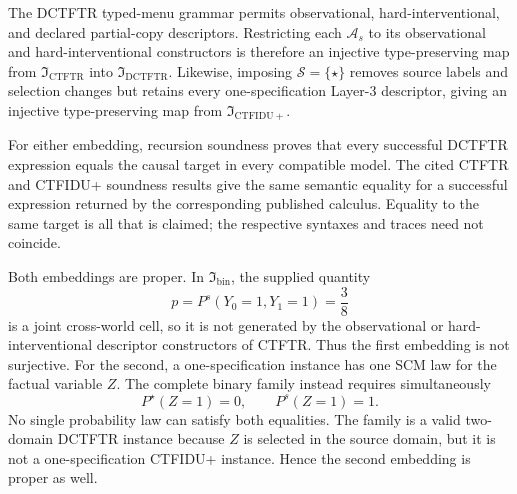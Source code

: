 The DCTFTR typed-menu grammar permits observational, hard-interventional, and declared partial-copy descriptors.  Restricting each \(\mathcal A_s\) to its observational and hard-interventional constructors is therefore an injective type-preserving map from \(\mathfrak I_{\mathrm{CTFTR}}\) into \(\mathfrak I_{\mathrm{DCTFTR}}\).  Likewise, imposing \(\mathcal S=\{\star\}\) removes source labels and selection changes but retains every one-specification Layer-3 descriptor, giving an injective type-preserving map from \(\mathfrak I_{\mathrm{CTFIDU+}}\).

For either embedding, recursion soundness proves that every successful DCTFTR expression equals the causal target in every compatible model.  The cited CTFTR and CTFIDU+ soundness results give the same semantic equality for a successful expression returned by the corresponding published calculus.  Equality to the same target is all that is claimed; the respective syntaxes and traces need not coincide.

Both embeddings are proper.  In \(\mathfrak I_{\mathrm{bin}}\), the supplied quantity
\[
 p=P^s(Y_0=1,Y_1=1)=\frac38
\]
is a joint cross-world cell, so it is not generated by the observational or hard-interventional descriptor constructors of CTFTR.  Thus the first embedding is not surjective.  For the second, a one-specification instance has one SCM law for the factual variable \(Z\).  The complete binary family instead requires simultaneously
\[
 P^\star(Z=1)=0,
 \qquad P^s(Z=1)=1.
\]
No single probability law can satisfy both equalities.  The family is a valid two-domain DCTFTR instance because \(Z\) is selected in the source domain, but it is not a one-specification CTFIDU+ instance.  Hence the second embedding is proper as well.